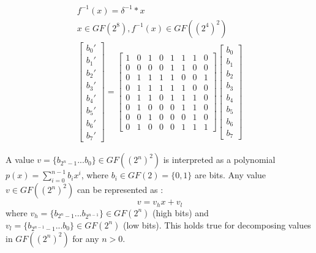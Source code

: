\begin{equation}
\begin{gathered}
\label{eq:iso_map_rev}
f^{-1}(x) = \delta^{-1} * x\\
x \in GF(2^8), f^{-1}(x) \in GF((2^4)^2) \\
\begin{bmatrix}
b_0'\\b_1'\\b_2'\\b_3'\\b_4'\\b_5'\\b_6'\\b_7'
\end{bmatrix}
=
\begin{bmatrix}
    1 & 0 & 1 & 0 & 1 & 1 & 1 & 0 \\
    0 & 0 & 0 & 0 & 1 & 1 & 0 & 0 \\
    0 & 1 & 1 & 1 & 1 & 0 & 0 & 1 \\
    0 & 1 & 1 & 1 & 1 & 1 & 0 & 0 \\
    0 & 1 & 1 & 0 & 1 & 1 & 1 & 0 \\
    0 & 1 & 0 & 0 & 0 & 1 & 1 & 0 \\
    0 & 0 & 1 & 0 & 0 & 0 & 1 & 0 \\
    0 & 1 & 0 & 0 & 0 & 1 & 1 & 1
\end{bmatrix}
\begin{bmatrix}
b_0\\b_1\\b_2\\b_3\\b_4\\b_5\\b_6\\b_7
\end{bmatrix}
\end{gathered}
\end{equation}

A value $v = \{b_{2^n-1}...b_0\} \in GF((2^n)^2)$ is interpreted as a polynomial $p(x) = \sum_{i=0}^{n-1} b_ix^i$, where $b_i \in GF(2) = \{0, 1\}$ are bits. Any value $v \in GF((2^n)^2)$ can be represented as \cite{vlsi}:
\begin{equation}
\label{eq:poly_repr}
v = v_hx + v_l
\end{equation}
where $v_h = \{b_{2^n-1}...b_{2^{n-1}}\} \in GF(2^n)$ (high bits) and $v_l = \{b_{2^{n-1}-1}...b_0\} \in GF(2^n)$ (low bits). This holds true for decomposing values in $GF((2^n)^2)$ for any $n > 0$.


